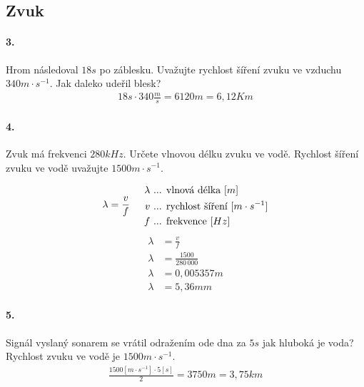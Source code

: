 \documentclass[12pt]{article}
\begin{document}
\pagebreak
\subsection{Zvuk}
\paragraph{3.}
Hrom následoval $18s$ po záblesku. Uvažujte rychlost šíření zvuku ve vzduchu $340m\cdot s^{-1}$. Jak daleko udeřil blesk?
\begin{equation}
\begin{split}
\nonumber
18s\cdot 340\frac{m}{s} = 6120m = 6,12Km
\end{split}
\end{equation}

\paragraph{4.}
Zvuk má frekvenci $280kHz$. Určete vlnovou délku zvuku ve vodě. Rychlost šíření zvuku ve vodě uvažujte $1500m\cdot s^{-1}$.
\begin{multicols}{2}
\noindent
\begin{equation}
\begin{split}
\nonumber
\lambda &= \frac{v}{f}\\
\end{split}
\hspace{0,5cm}
\begin{split}
\nonumber
\lambda&\text{ ... vlnová délka }[m]\\
v&\text{ ... rychlost šíření }[m\cdot s^{-1}]\\
f&\text{ ... frekvence }[Hz]\\
\end{split}
\end{equation}
\columnbreak
\noindent
\begin{equation}
\begin{split}
\nonumber
\lambda&=\frac{v}{f}\\
\lambda&=\frac{1500}{280\, 000}\\
\lambda&=0,005357m\\
\lambda&=5,36mm
\end{split}
\end{equation}
\end{multicols}
\paragraph{5.}
Signál vyslaný sonarem se vrátil odražením ode dna za $5s$ jak hluboká je voda? Rychlost zvuku ve vodě je $1500m\cdot s^{-1}$.
\begin{equation}
\begin{split}
\nonumber
\frac{1500[m\cdot s^{-1		}]\cdot 5[s]}{2} = 3750m = 3,75km
\end{split}
\end{equation}
\end{document}

